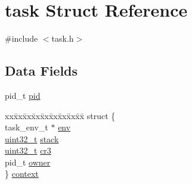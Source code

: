 \hypertarget{structtask}{\section{task Struct Reference}
\label{structtask}
}


{\ttfamily \#include $<$task.\+h$>$}

\subsection*{Data Fields}
\begin{DoxyCompactItemize}
\item 
pid\+\_\+t \hyperlink{structtask_ab56448ae42a75825ea923bd86648f3ae}{pid}
\item 
\begin{tabbing}
xx\=xx\=xx\=xx\=xx\=xx\=xx\=xx\=xx\=\kill
struct \{\\
\>task\_env\_t $\ast$ \hyperlink{structtask_a8dbbb79f7c29771d36f1d98ec84cbbdf}{env}\\
\>\hyperlink{aplus_8h_a53a0df51603c77c2aa5b9ea61b606a82}{uint32\_t} \hyperlink{structtask_a71232ebd31259f41c057b3e789b44587}{stack}\\
\>\hyperlink{aplus_8h_a53a0df51603c77c2aa5b9ea61b606a82}{uint32\_t} \hyperlink{structtask_a5f4968459d4640f19c7e802ae7057179}{cr3}\\
\>pid\_t \hyperlink{structtask_a34a5abdae35b067ec6cde7fc81a43598}{owner}\\
\} \hyperlink{structtask_a7e47fc3627188eeefc77f78e8d36ddd1}{context}\\


\end{tabbing}
\end{DoxyCompactItemize}
